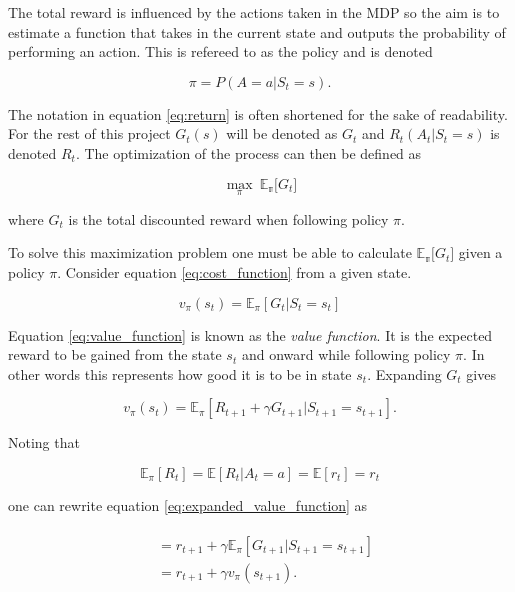 The total reward is influenced by the actions taken in the MDP so the aim is to estimate a function that takes in the current state and outputs the probability of performing an action. This is refereed to as the policy and is denoted

\begin{equation}
    \pi = P(A=a|S_t=s).
\end{equation}

The notation in equation \ref{eq:return} is often shortened for the sake of readability. For the rest of this project $G_t(s)$ will be denoted as $G_t$ and $R_t(A_t|S_t=s)$ is denoted $R_t$. The optimization of the process can then be defined as 

\begin{equation}
    \max_\pi ~ \mathbb{E_\pi}\big[G_t]
    \label{eq:cost_function}
\end{equation}

where $G_t$ is the total discounted reward when following policy $\pi$.

To solve this maximization problem one must be able to calculate $\mathbb{E_\pi}\big[G_t]$ given a policy $\pi$. Consider equation \ref{eq:cost_function} from a given state. 

\begin{equation}
    v_\pi(s_t) = \mathbb{E}_\pi[G_t|S_t=s_t]
    \label{eq:value_function}
\end{equation}

Equation \ref{eq:value_function} is known as the \textit{value function}. It is the expected reward to be gained from the state $s_t$ and onward while following policy $\pi$. In other words this represents how good it is to be in state $s_t$. Expanding $G_t$ gives

\begin{equation}
    v_\pi(s_t)  = \mathbb{E}_\pi[R_{t+1} + \gamma G_{t+1}|S_{t+1}=s_{t+1}].
    \label{eq:expanded_value_function}
\end{equation}

Noting that 

\begin{equation}
    \mathbb{E}_\pi[R_t] = \mathbb{E}[R_t|A_t=a] = \mathbb{E}[r_t] = r_t
\end{equation}

one can rewrite equation \ref{eq:expanded_value_function} as 

\begin{align}
\begin{split}
    &=  r_{t+1} + \gamma\mathbb{E}_\pi[G_{t+1}|S_{t+1}=s_{t+1}] \\
    &= r_{t+1} + \gamma v_\pi(s_{t+1}).
    \label{eq:bellman_value_function}
\end{split}
\end{align}

